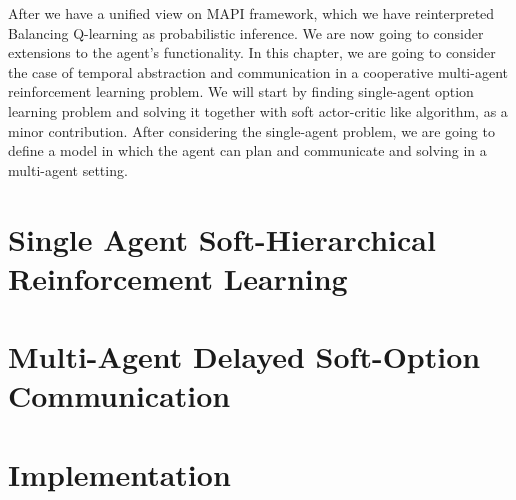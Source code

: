 \label{chapter:chap4}
\begin{miniabstract}
After we have a unified view on MAPI framework, which we have reinterpreted Balancing Q-learning \cite{grau2018balancing} as probabilistic inference. We are now going to consider extensions to the agent's functionality. In this chapter, we are going to consider the case of temporal abstraction and communication in a cooperative multi-agent reinforcement learning problem. We will start by finding single-agent option learning problem and solving it together with soft actor-critic like algorithm, as a minor contribution. After considering the single-agent problem, we are going to define a model in which the agent can plan and communicate and solving in a multi-agent setting.
\end{miniabstract}


\section{Single Agent Soft-Hierarchical Reinforcement Learning}


\section{Multi-Agent Delayed Soft-Option Communication}


\section{Implementation}


